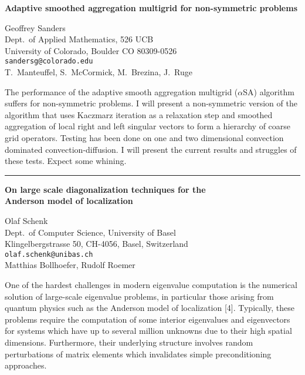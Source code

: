 \documentclass[twosided]{report}
\begin{document}
\begin{center}
{\large			%
{\bf Adaptive smoothed aggregation multigrid for non-symmetric problems}}

	Geoffrey Sanders \\
	Dept.~of Applied Mathematics, 526 UCB \\
	University of Colorado, Boulder CO 80309-0526 \\
	{\tt sandersg@colorado.edu} \\
	T.~Manteuffel, S.~McCormick, M.~Brezina, J.~Ruge
\end{center}
The performance of the adaptive smooth aggregation multigrid
($\alpha$SA) algorithm suffers for non-symmetric problems. I
will present a non-symmetric version of the algorithm that
uses Kaczmarz iteration as a relaxation step and smoothed
aggregation of local right and left singular vectors to form
a hierarchy of coarse grid operators. Testing has been done
on one and two dimensional convection dominated
convection-diffusion. I will present the current results and
struggles of these tests. Expect some whining.



	\begin{center} \rule{6in}{1pt} \end{center}

\begin{center}
{\large			%
{\bf On large scale diagonalization techniques for the \\
	Anderson model of localization}}

	Olaf Schenk \\
	Dept.~of Computer Science, University of Basel \\
	Klingelbergstrasse 50, CH-4056, Basel, Switzerland \\
	{\tt olaf.schenk@unibas.ch} \\
	Matthias Bollhoefer, Rudolf Roemer
\end{center}
One of the hardest challenges in modern eigenvalue
computation is the numerical solution of large-scale
eigenvalue problems, in particular those arising from
quantum physics such as the Anderson model of localization
[4]. Typically, these problems require the computation of
some interior eigenvalues and eigenvectors for systems which
have up to several million unknowns due to their high
spatial dimensions. Furthermore, their underlying structure
involves random perturbations of matrix elements which
invalidates simple preconditioning approaches.
\end{document}
